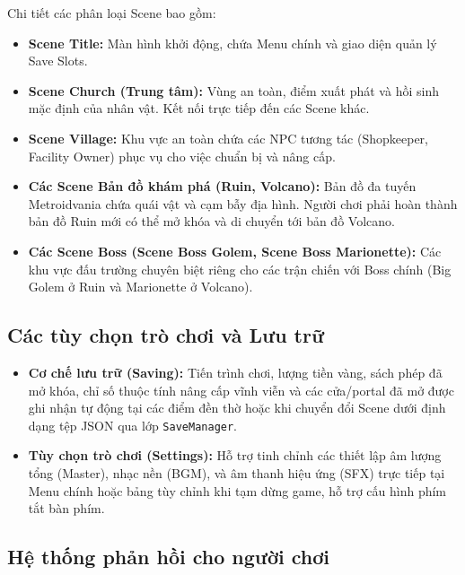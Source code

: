 \documentclass[../DoAn.tex]{subfiles}
\begin{document}
Chi tiết các phân loại Scene bao gồm:
\begin{itemize}
    \item \textbf{Scene Title:} Màn hình khởi động, chứa Menu chính và giao diện quản lý Save Slots.
    \item \textbf{Scene Church (Trung tâm):} Vùng an toàn, điểm xuất phát và hồi sinh mặc định của nhân vật. Kết nối trực tiếp đến các Scene khác.
    \item \textbf{Scene Village:} Khu vực an toàn chứa các NPC tương tác (Shopkeeper, Facility Owner) phục vụ cho việc chuẩn bị và nâng cấp.
    \item \textbf{Các Scene Bản đồ khám phá (Ruin, Volcano):} Bản đồ đa tuyến Metroidvania chứa quái vật và cạm bẫy địa hình. Người chơi phải hoàn thành bản đồ Ruin mới có thể mở khóa và di chuyển tới bản đồ Volcano.
    \item \textbf{Các Scene Boss (Scene Boss Golem, Scene Boss Marionette):} Các khu vực đấu trường chuyên biệt riêng cho các trận chiến với Boss chính (Big Golem ở Ruin và Marionette ở Volcano).
\end{itemize}

\subsection{Các tùy chọn trò chơi và Lưu trữ}
\label{subsection:3.3.5}

\begin{itemize}
    \item \textbf{Cơ chế lưu trữ (Saving):} Tiến trình chơi, lượng tiền vàng, sách phép đã mở khóa, chỉ số thuộc tính nâng cấp vĩnh viễn và các cửa/portal đã mở được ghi nhận tự động tại các điểm đền thờ hoặc khi chuyển đổi Scene dưới định dạng tệp JSON qua lớp \texttt{SaveManager}.
    \item \textbf{Tùy chọn trò chơi (Settings):} Hỗ trợ tinh chỉnh các thiết lập âm lượng tổng (Master), nhạc nền (BGM), và âm thanh hiệu ứng (SFX) trực tiếp tại Menu chính hoặc bảng tùy chỉnh khi tạm dừng game, hỗ trợ cấu hình phím tắt bàn phím.
\end{itemize}

\subsection{Hệ thống phản hồi cho người chơi}
\label{subsection:3.3.6}
\end{document}
